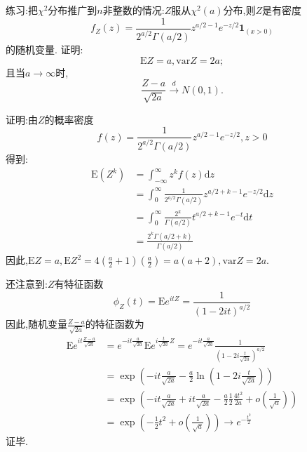 	\begin{frame}
		练习:把$\chi^2$分布推广到$n$非整数的情况:$Z$服从$\chi^2(a)$分布,则$Z$是有密度
		\begin{equation}
			f_Z(z)=\frac{1}{2^{a/2}\Gamma(a/2)}z^{a/2-1}e^{-z/2}\bm{1}_{(x>0)}
		\end{equation}
		的随机变量.
		证明: 
		\alert{
		\begin{equation}
			\mathrm{E}Z = a,\mathrm{var}Z=2a;
		\end{equation}
		}
		且当$a\rightarrow\infty$时,
		\begin{equation}
			\frac{Z-a}{\sqrt{2a}}\stackrel{d}{\longrightarrow}N(0,1).
		\end{equation}
	\end{frame}

	\begin{frame}
		证明:由$Z$的概率密度
		\begin{equation}
			f(z) = \frac{1}{2^{a/2}\Gamma(a/2)}z^{a/2-1}e^{-z/2},z>0
		\end{equation}
		得到:
		\begin{equation}
			\begin{split}
				\mathrm{E}(Z^k) &= \int_{-\infty }^{\infty}z^kf(z)\mathrm{d}z \\
				&= \int_{0}^{\infty}\frac{1}{2^{a/2}\Gamma(a/2)}z^{a/2+k-1}e^{-z/2}\mathrm{d}z \\
				&= \int_{0}^{\infty}\frac{2^k}{\Gamma(a/2)}t^{a/2+k-1}e^{-t}\mathrm{d}t \\
				&= \frac{2^k\Gamma(a/2+k)}{\Gamma(a/2)}
			\end{split}
		\end{equation}
		因此,$\mathrm{E}Z = a,\mathrm{E}Z^2 = 4(\frac{a}{2}+1)(\frac{a}{2}) =a(a+2),\mathrm{var}Z=2a. $
	\end{frame}

	\begin{frame}
		还注意到:$Z$有特征函数
		\begin{equation}
		\phi_Z(t) = \mathrm{E}e^{itZ} = \frac{1}{\left(1-2it\right)^{a/2}}
		\end{equation}
		因此,随机变量$\frac{Z-a}{\sqrt{2a}}$的特征函数为
		\begin{equation}
		\begin{split}
		\mathrm{E}e^{it\frac{Z-a}{\sqrt{2a}}}&=e^{-it\frac{a}{\sqrt{2a}}}\mathrm{E}e^{i\frac{t}{\sqrt{2a}}Z} = e^{-it\frac{a}{\sqrt{2a}}}\frac{1}{\left(1-2i\frac{t}{\sqrt{2a}}\right)^{a/2}} \\
		&= \exp\left(-it\frac{a}{\sqrt{2a}}-\frac{a}{2}\ln(1-2i\frac{t}{\sqrt{2a}})\right) \\
		&= \exp\left(-it\frac{a}{\sqrt{2a}}+it\frac{a}{\sqrt{2a}}-\frac{a}{2}\frac{1}{2}\frac{4t^2}{2a}+o(\frac{1}{\sqrt{a}})  \right)\\
		&=\exp\left(-\frac{1}{2}t^2+o(\frac{1}{\sqrt{a}})  \right)\rightarrow e^{-\frac{t^2}{2}}
		\end{split}
		\end{equation}证毕.
	\end{frame}

